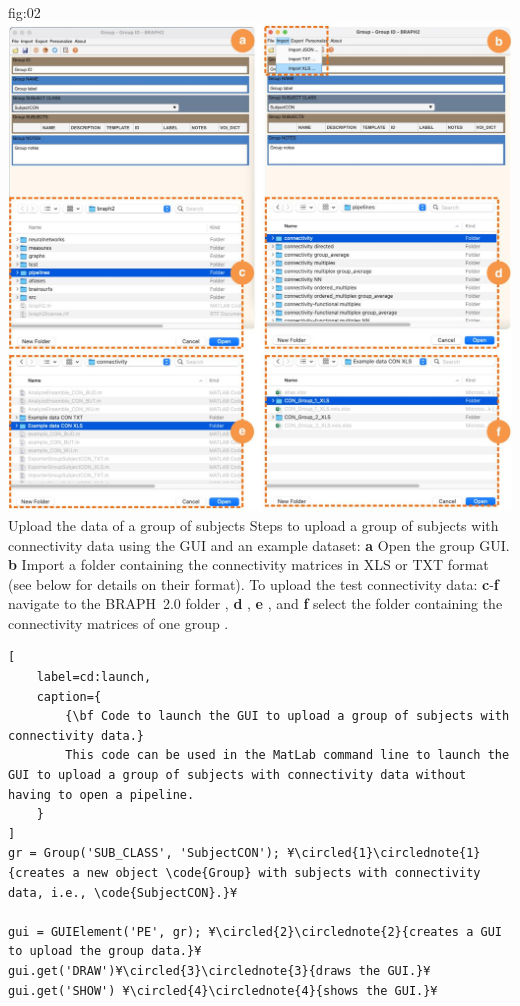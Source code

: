 \documentclass[justified]{tufte-handout}
\begin{document}
	{fig:02}
	{
	\includegraphics{fig02.jpg}
	}
	{Upload the data of a group of subjects}
	{
	Steps to upload a group of subjects with connectivity data using the GUI and an example dataset: 
	{\bf a} Open the group GUI.
	{\bf b} Import a folder containing the connectivity matrices in XLS or TXT format (see below for details on their format).
	To upload the test connectivity data:
	{\bf c}-{\bf f} navigate to the BRAPH~2.0 folder , {\bf d} ,  {\bf e} , and {\bf f} select the folder containing the connectivity matrices of one group .
	}

%
\begin{lstlisting}[
	label=cd:launch,
	caption={
		{\bf Code to launch the GUI to upload a group of subjects with connectivity data.}
		This code can be used in the MatLab command line to launch the GUI to upload a group of subjects with connectivity data without having to open a pipeline.
	}
]
gr = Group('SUB_CLASS', 'SubjectCON'); ¥\circled{1}\circlednote{1}{creates a new object \code{Group} with subjects with connectivity data, i.e., \code{SubjectCON}.}¥

gui = GUIElement('PE', gr); ¥\circled{2}\circlednote{2}{creates a GUI to upload the group data.}¥
gui.get('DRAW')¥\circled{3}\circlednote{3}{draws the GUI.}¥
gui.get('SHOW') ¥\circled{4}\circlednote{4}{shows the GUI.}¥
\end{lstlisting}
\end{document}
